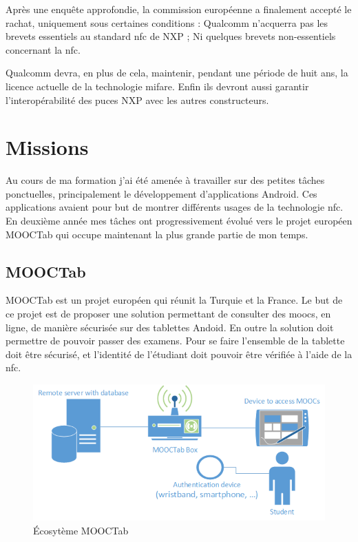 \documentclass[french,12pt,a4paper,titlepage,openright,openbib]{report}
\begin{document}
Après une enquête approfondie, la commission européenne a finalement accepté le rachat, uniquement sous certaines conditions :
Qualcomm n'acquerra pas les brevets essentiels au standard \gls{nfc} de NXP ; Ni quelques brevets non-essentiels concernant la \gls{nfc}.

Qualcomm devra, en plus de cela, maintenir, pendant une période de huit ans, la licence actuelle de la technologie \gls{mifare}. Enfin ils devront aussi garantir l'interopérabilité des puces NXP avec les autres constructeurs.

\chapter{Missions}
Au cours de ma formation j'ai été amenée à travailler sur des petites tâches ponctuelles, principalement le développement d'applications Android. Ces applications avaient pour but de montrer différents usages de la technologie \gls{nfc}.
En deuxième année mes tâches ont progressivement évolué vers le projet européen MOOCTab qui occupe maintenant la plus grande partie de mon temps.

\section{MOOCTab}
MOOCTab est un projet européen qui réunit la Turquie et la France. Le but de ce projet est de proposer une solution permettant de consulter des \glspl{mooc}, en ligne, de manière sécurisée sur des tablettes Andoid. En outre la solution doit permettre de pouvoir passer des examens. Pour se faire l'ensemble de la tablette doit être sécurisé, et l'identité de l'étudiant doit pouvoir être vérifiée à l'aide de la \gls{nfc}.
\begin{figure}
	\center
	\includegraphics[]{ecosystem_mooctab}
	\caption{Écosytème MOOCTab}
\end{figure}
\end{document}
